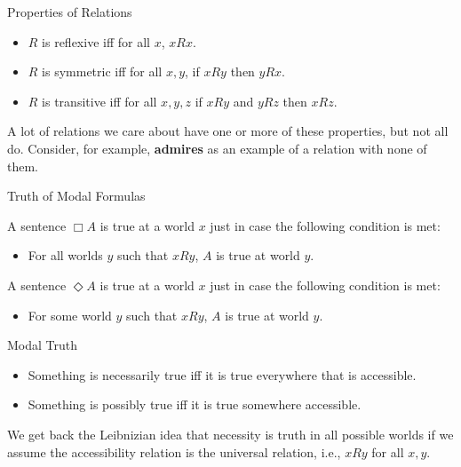 \documentclass[
  ignorenonframetext,
]{beamer}
\providecommand{\tightlist}{%
  \setlength{\itemsep}{0pt}\setlength{\parskip}{0pt}}
\renewcommand{\,}{\text{, }}
\begin{document}
\begin{frame}{Properties of Relations}
\protect\hypertarget{properties-of-relations}{}

\begin{itemize}
\tightlist
\item
  \(R\) is reflexive iff for all \(x\), \(xRx\).\pause
\item
  \(R\) is symmetric iff for all \(x, y\), if \(xRy\) then
  \(yRx\).\pause
\item
  \(R\) is transitive iff for all \(x, y, z\) if \(xRy\) and \(yRz\)
  then \(xRz\).\pause
\end{itemize}

A lot of relations we care about have one or more of these properties,
but not all do. Consider, for example, \textbf{admires} as an example of
a relation with none of them.

\end{frame}

\begin{frame}{Truth of Modal Formulas}
\protect\hypertarget{truth-of-modal-formulas}{}

A sentence \(\Box A\) is true at a world \(x\) just in case the
following condition is met:

\begin{itemize}
\tightlist
\item
  For all worlds \(y\) such that \(xRy\), \(A\) is true at world
  \(y\).\pause
\end{itemize}

A sentence \(\Diamond A\) is true at a world \(x\) just in case the
following condition is met:

\begin{itemize}
\tightlist
\item
  For some world \(y\) such that \(xRy\), \(A\) is true at world \(y\).
\end{itemize}

\end{frame}

\begin{frame}{Modal Truth}
\protect\hypertarget{modal-truth}{}

\begin{itemize}
\tightlist
\item
  Something is necessarily true iff it is true everywhere that is
  accessible.
\item
  Something is possibly true iff it is true somewhere accessible. \pause
\end{itemize}

We get back the Leibnizian idea that necessity is truth in all possible
worlds if we assume the accessibility relation is the universal
relation, i.e., \(xRy\) for all \(x, y\).

\end{frame}
\end{document}
